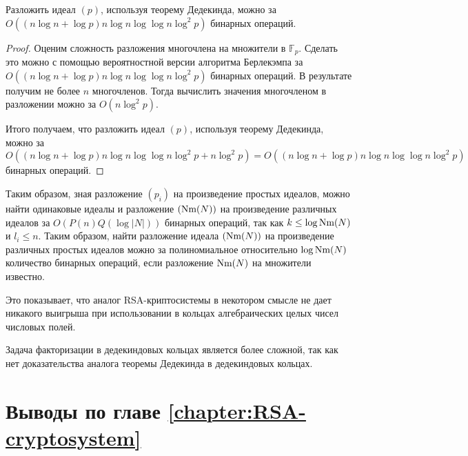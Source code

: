 \documentclass[_00_dissertation.tex]{subfiles}
\begin{document}
\begin{proposition}
    Разложить идеал $(p)$, используя теорему Дедекинда, можно за $O((n\log n + \log p)n\log n\log\log n\log^2 p)$ бинарных операций.
\end{proposition}
\begin{proof}
    Оценим сложность разложения многочлена на множители в $\mathbb{F}_p$.
    Сделать это можно с помощью вероятностной версии алгоритма Берлекэмпа за $O((n\log n + \log p)n\log n\log\log n\log^2 p)$ бинарных операций.
    В результате получим не более $n$ многочленов.
    Тогда вычислить значения многочленом в разложении можно за $O(n\log^2 p)$.

    Итого получаем, что разложить идеал $(p)$, используя теорему Дедекинда, можно за $O((n\log n + \log p)n\log n\log\log n\log^2 p + n\log^2 p) = O((n\log n + \log p)n\log n\log\log n\log^2 p)$ бинарных операций.
\end{proof}

\begin{remark}
    Таким образом, зная разложение $(p_i)$ на произведение простых идеалов, можно найти одинаковые идеалы и разложение $(\textrm{Nm}(N))$ на произведение различных идеалов за $O(P(n)Q(\log |N|))$ бинарных операций, так как $k \le \log \textrm{Nm}(N)$ и $l_i \le n$.
    Таким образом, найти разложение идеала $(\textrm{Nm}(N))$ на произведение различных простых идеалов можно за полиномиальное относительно $\log\textrm{Nm}(N)$ количество бинарных операций, если разложение $\textrm{Nm}(N)$ на множители известно.

    Это показывает, что аналог RSA-криптосистемы в некотором смысле не дает никакого выигрыша при использовании в кольцах алгебраических целых чисел числовых полей.
\end{remark}

\begin{remark}
    Задача факторизации в дедекиндовых кольцах является более сложной, так как нет доказательства аналога теоремы Дедекинда в дедекиндовых кольцах.
\end{remark}

\section*{Выводы по главе \ref{chapter:RSA-cryptosystem}}

\onlyinsubfile{
    
    
}
\end{document}
